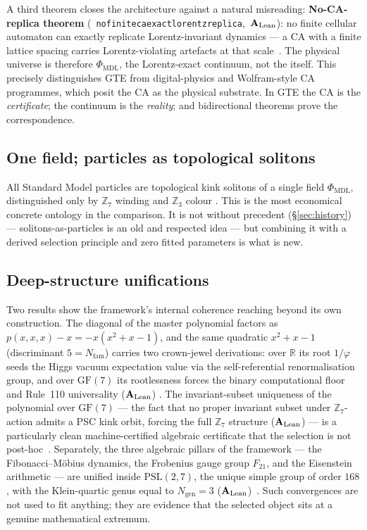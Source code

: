 \documentclass[11pt]{article}
\newcommand{\CMCA}{\text{CMCA}}
\newcommand{\PHIMDL}{\ensuremath{\Phi_{\mathrm{MDL}}}}
\newcommand{\ZS}{\ensuremath{\mathbb{Z}_7}}
\newcommand{\GF}[1]{\ensuremath{\mathrm{GF}(#1)}}
\newcommand{\Ngen}{\ensuremath{N_{\mathrm{gen}}}}
\newcommand{\Nfam}{\ensuremath{N_{\mathrm{fam}}}}
\newcommand{\lean}[1]{%
  \penalty-100
  \begingroup\def\_{\textunderscore\allowbreak}\texttt{#1}\endgroup}
\newcommand{\CatAL}{\ensuremath{\textbf{A}_{\rm Lean}}}
\begin{document}
A third theorem closes the architecture against a natural misreading:
\textbf{No-CA-replica theorem}
\mbox{(\lean{no\_finite\_ca\_exact\_lorentz\_replica}, \CatAL)}: no finite cellular
automaton can exactly replicate Lorentz-invariant dynamics --- a CA with a finite
lattice spacing carries Lorentz-violating artefacts at that scale~\cite{SpivackCompleteness}.  The physical universe is
therefore $\PHIMDL$, the Lorentz-exact continuum, not the \CMCA{} itself.  This
precisely distinguishes GTE from digital-physics and Wolfram-style CA programmes,
which posit the CA as the physical substrate.  In GTE the CA is the
\emph{certificate}; the continuum is the \emph{reality}; and bidirectional theorems
prove the correspondence.

\subsection{One field; particles as topological solitons}

All Standard Model particles are topological kink solitons of a single field
$\PHIMDL$, distinguished only by $\mathbb{Z}_7$ winding and $\mathbb{Z}_3$ colour
\cite{SpivackThreeTapeCMCA}.  This is the most economical concrete ontology in the
comparison.  It is not without precedent (§\ref{sec:history}) --- solitons-as-particles
is an old and respected idea --- but combining it with a derived selection
principle and zero fitted parameters is what is new.

\subsection{Deep-structure unifications}

Two results show the framework's internal coherence reaching beyond its own
construction.  The diagonal of the master polynomial factors as
$p(x,x,x)-x = -x(x^2+x-1)$, and the same quadratic $x^2+x-1$ (discriminant
$5 = \Nfam$) carries two crown-jewel derivations: over $\mathbb{R}$ its root
$1/\varphi$ seeds the Higgs vacuum expectation value via the self-referential
renormalisation group, and over $\GF{7}$ its rootlessness forces the binary
computational floor and Rule~110 universality (\CatAL)
\cite{SpivackGTEPolynomialWolfram,SpivackSRRG}.  The invariant-subset uniqueness
of the polynomial over $\GF{7}$ --- the fact that no proper invariant subset under
$\ZS$-action admits a PSC kink orbit, forcing the full $\ZS$ structure (\CatAL) ---
is a particularly clean machine-certified algebraic certificate that the selection
is not post-hoc~\cite{SpivackGTEPolynomialWolfram}.  Separately, the three algebraic
pillars of the framework --- the Fibonacci--M\"obius dynamics, the Frobenius gauge
group $F_{21}$, and the Eisenstein arithmetic --- are unified inside
$\mathrm{PSL}(2,7)$, the unique simple group of order $168$, with the Klein-quartic
genus equal to $\Ngen = 3$ (\CatAL)~\cite{SpivackPSL27Unification}.  Such
convergences are not used to fit anything; they are evidence that the selected
object sits at a genuine mathematical extremum.
\end{document}

